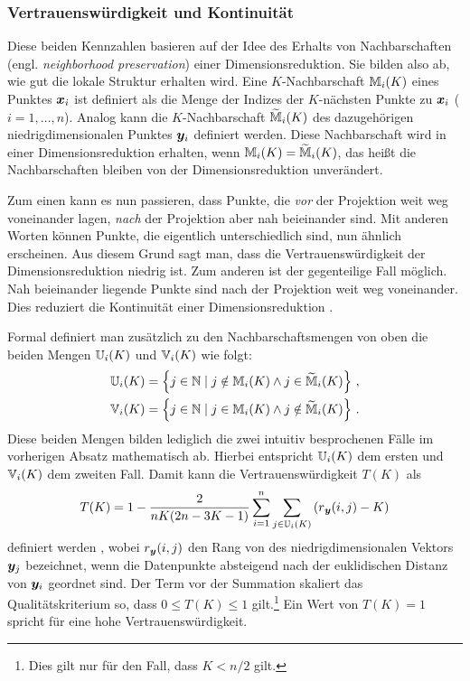 \subsubsection{Vertrauenswürdigkeit und Kontinuität}
\label{ch:Vergleich:sec:Methodik:subsec:Qualitaetskriterien:TC}
Diese beiden Kennzahlen basieren auf der Idee des Erhalts von Nachbarschaften (engl.
\textit{neighborhood preservation}) einer Dimensionsreduktion. Sie bilden also ab, wie gut die
lokale Struktur erhalten wird. Eine $K$-Nachbarschaft $\mathbb{M}_i(K)$ eines Punktes $\bm{x}_i$ ist
definiert als die Menge der Indizes der $K$-nächsten Punkte zu $\bm{x}_i$ ($i = 1, \ldots, n$).
Analog kann die $K$-Nachbarschaft $\widetilde{\mathbb{M}}_i(K)$ des dazugehörigen niedrigdimensionalen
Punktes $\bm{y}_i$ definiert werden. Diese Nachbarschaft wird in einer Dimensionsreduktion
erhalten, wenn $\mathbb{M}_i(K) = \widetilde{\mathbb{M}}_i(K)$, das heißt die Nachbarschaften bleiben von
der Dimensionsreduktion unverändert.

Zum einen kann es nun passieren, dass Punkte, die \textit{vor} der Projektion weit weg voneinander
lagen, \textit{nach} der Projektion aber nah beieinander sind. Mit anderen Worten können Punkte,
die eigentlich unterschiedlich sind, nun ähnlich erscheinen. Aus diesem Grund sagt man, dass die
Vertrauenswürdigkeit der Dimensionsreduktion niedrig ist. Zum anderen ist der gegenteilige Fall
möglich. Nah beieinander liegende Punkte sind nach der Projektion weit weg voneinander. Dies
reduziert die Kontinuität einer Dimensionsreduktion \parencite[486 -- 487]{Venna.2001}.

Formal definiert man zusätzlich zu den Nachbarschaftsmengen von oben die beiden Mengen
$\mathbb{U}_i(K)$ und $\mathbb{V}_i(K)$ wie folgt:
\begin{gather}
	\mathbb{U}_i(K) =  \left\{ j \in \mathbb{N} \mid j \notin \mathbb{M}_i(K) \land j \in \widetilde{\mathbb{M}}_i(K) \right\} \, , \\
	\mathbb{V}_i(K) =  \left\{ j \in \mathbb{N} \mid j \in \mathbb{M}_i(K) \land j \notin \widetilde{\mathbb{M}}_i(K) \right\} \, .
\end{gather}
Diese beiden Mengen bilden lediglich die zwei intuitiv besprochenen Fälle im vorherigen Absatz mathematisch ab. Hierbei entspricht $\mathbb{U}_i(K)$ dem ersten und $\mathbb{V}_i(K)$ dem zweiten Fall.
Damit kann die Vertrauenswürdigkeit $T(K)$ als
\begin{equation}
	T(K) = 1 - \frac{2}{nK(2n - 3K - 1)} \sum_{i = 1}^{n}\sum_{j \in \set{U}_i(K) } \left( r­_{\vect{y}}(i, j) - K \right)
\end{equation}
definiert werden \parencite[487]{Venna.2001}, wobei $r_{\bm{y}}(i, j)$ den Rang von des niedrigdimensionalen Vektors
$\bm{y}_j$ bezeichnet, wenn die Datenpunkte absteigend nach der euklidischen Distanz von
$\bm{y}_i$ geordnet sind. Der Term vor der Summation skaliert das Qualitätskriterium so, dass $0
	\leq T(K) \leq 1$ gilt.\footnote{Dies gilt nur für den Fall, dass $K < n/2$ gilt.} Ein Wert von
$T(K) = 1­$ spricht für eine hohe Vertrauenswürdigkeit.

